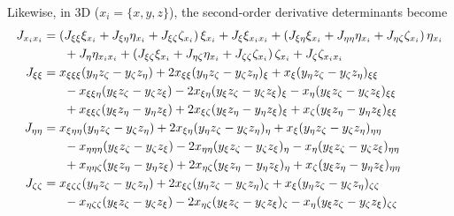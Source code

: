 \documentclass{article}
\begin{document}
Likewise, in 3D ($x_i = \{x,y,z\}$), the second-order derivative determinants become
\begin{subequations}
\begin{align}
J_{x_i x_i}		&= \left(J_{\xi\xi}\xi_{x_i}+J_{\xi\eta}\eta_{x_i}+J_{\xi\zeta}\zeta_{x_i}\right)\xi_{x_i}+J_{\xi}\xi_{x_i x_i}+\left(J_{\xi\eta}\xi_{x_i}+J_{\eta\eta}\eta_{x_i}+J_{\eta\zeta}\zeta_{x_i}\right)\eta_{x_i} \notag \\
			&\hspace{6mm}+J_{\eta}\eta_{x_i x_i}+\left(J_{\xi\zeta}\xi_{x_i}+J_{\eta\zeta}\eta_{x_i}+J_{\zeta\zeta}\zeta_{x_i}\right)\zeta_{x_i}+J_{\zeta}\zeta_{x_i x_i} \\
J_{\xi\xi}		&= x_{\xi\xi\xi}(y_{\eta}z_{\zeta}-y_{\zeta}z_{\eta})+2x_{\xi\xi}(y_{\eta}z_{\zeta}-y_{\zeta}z_{\eta})_{\xi}+x_{\xi}(y_{\eta}z_{\zeta}-y_{\zeta}z_{\eta})_{\xi\xi} \notag \\
			&\hspace{6mm}-x_{\xi\xi\eta}(y_{\xi}z_{\zeta}-y_{\zeta}z_{\xi})-2x_{\xi\eta}(y_{\xi}z_{\zeta}-y_{\zeta}z_{\xi})_{\xi}-x_{\eta}(y_{\xi}z_{\zeta}-y_{\zeta}z_{\xi})_{\xi\xi} \notag \\
			&\hspace{6mm}+x_{\xi\xi\zeta}(y_{\xi}z_{\eta}-y_{\eta}z_{\xi})+2x_{\xi\zeta}(y_{\xi}z_{\eta}-y_{\eta}z_{\xi})_{\xi}+x_{\zeta}(y_{\xi}z_{\eta}-y_{\eta}z_{\xi})_{\xi\xi} \\
J_{\eta\eta}		&= x_{\xi\eta\eta}(y_{\eta}z_{\zeta}-y_{\zeta}z_{\eta})+2x_{\xi\eta}(y_{\eta}z_{\zeta}-y_{\zeta}z_{\eta})_{\eta}+x_{\xi}(y_{\eta}z_{\zeta}-y_{\zeta}z_{\eta})_{\eta\eta} \notag \\
			&\hspace{6mm}-x_{\eta\eta\eta}(y_{\xi}z_{\zeta}-y_{\zeta}z_{\xi})-2x_{\eta\eta}(y_{\xi}z_{\zeta}-y_{\zeta}z_{\xi})_{\eta}-x_{\eta}(y_{\xi}z_{\zeta}-y_{\zeta}z_{\xi})_{\eta\eta} \notag \\
			&\hspace{6mm}+x_{\eta\eta\zeta}(y_{\xi}z_{\eta}-y_{\eta}z_{\xi})+2x_{\eta\zeta}(y_{\xi}z_{\eta}-y_{\eta}z_{\xi})_{\eta}+x_{\zeta}(y_{\xi}z_{\eta}-y_{\eta}z_{\xi})_{\eta\eta} \\
J_{\zeta\zeta}	&= x_{\xi\zeta\zeta}(y_{\eta}z_{\zeta}-y_{\zeta}z_{\eta})+2x_{\xi\zeta}(y_{\eta}z_{\zeta}-y_{\zeta}z_{\eta})_{\zeta}+x_{\xi}(y_{\eta}z_{\zeta}-y_{\zeta}z_{\eta})_{\zeta\zeta} \notag \\
			&\hspace{6mm}-x_{\eta\zeta\zeta}(y_{\xi}z_{\zeta}-y_{\zeta}z_{\xi})-2x_{\eta\zeta}(y_{\xi}z_{\zeta}-y_{\zeta}z_{\xi})_{\zeta}-x_{\eta}(y_{\xi}z_{\zeta}-y_{\zeta}z_{\xi})_{\zeta\zeta} \notag \\

\end{align}
\end{subequations}
\end{document}
